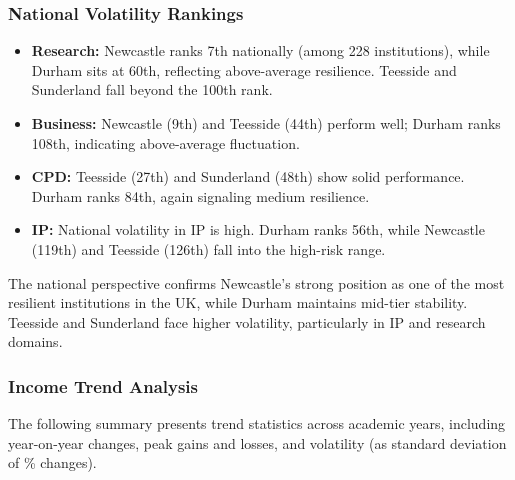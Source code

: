 \documentclass[journal,onecolumn, 10pt,draftclsnofoot]{IEEEtran}
\begin{document}
\subsubsection{National Volatility Rankings}

\begin{itemize}
    \item \textbf{Research:} Newcastle ranks 7th nationally (among 228 institutions), while Durham sits at 60th, reflecting above-average resilience. Teesside and Sunderland fall beyond the 100th rank.
    
    \item \textbf{Business:} Newcastle (9th) and Teesside (44th) perform well; Durham ranks 108th, indicating above-average fluctuation.
    
    \item \textbf{CPD:} Teesside (27th) and Sunderland (48th) show solid performance. Durham ranks 84th, again signaling medium resilience.
    
    \item \textbf{IP:} National volatility in IP is high. Durham ranks 56th, while Newcastle (119th) and Teesside (126th) fall into the high-risk range.
\end{itemize}

The national perspective confirms Newcastle's strong position as one of the most resilient institutions in the UK, while Durham maintains mid-tier stability. Teesside and Sunderland face higher volatility, particularly in IP and research domains.

\subsubsection{Income Trend Analysis}

The following summary presents trend statistics across academic years, including year-on-year changes, peak gains and losses, and volatility (as standard deviation of \% changes).
\end{document}
